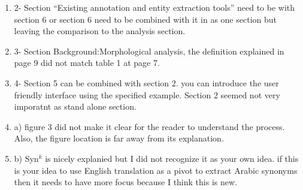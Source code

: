 \begin{enumerate}[leftmargin=0mm,label=\bfseries CommentR3.\arabic*]
\item \label{Review.3.9}
2- Section ``Existing annotation and entity extraction tools” 
need to be with section 6 or section 6 need to be combined 
with it in as one section but leaving the comparison to 
the analysis section.



\item \label{Review.3.10}
3- Section Background:Morphological analysis, 
the definition explained in page 9 did not match table 1 at page 7.



\item \label{Review.3.11}
4- Section 5 can be combined with section 2. 
you can introduce the user friendly interface using the 
specified example. 
Section 2 seemed not very imporatnt as stand alone section.




\item \label{Review.3.12}
a) figure 3 did not make it clear for the reader to 
understand the process. Also, the figure location is far 
away from its explanation.




\item \label{Review.3.13}
b) Syn$^k$ is nicely explanied but I did not recognize it as 
your own idea. if this is your idea to use English translation 
as a pivot to extract Arabic synonyms then it needs to have 
more focus because I think this is new.



\end{enumerate}
